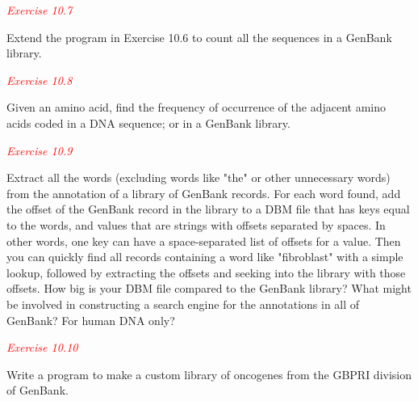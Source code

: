 \textcolor{red}{\textit{Exercise 10.7}}
\begin{adjustwidth}{1cm}{}
Extend the program in Exercise 10.6 to count all the sequences in a GenBank library. 
\end{adjustwidth}

\textcolor{red}{\textit{Exercise 10.8}}
\begin{adjustwidth}{1cm}{}
Given an amino acid, find the frequency of occurrence of the adjacent amino acids coded in a DNA sequence; or in a GenBank library. 
\end{adjustwidth}

\textcolor{red}{\textit{Exercise 10.9}}
\begin{adjustwidth}{1cm}{}
Extract all the words (excluding words like "the" or other unnecessary words) from the annotation of a library of GenBank records. For each word found, add the offset of the GenBank record in the library to a DBM file that has keys equal to the words, and values that are strings with offsets separated by spaces. In other words, one key can have a space-separated list of offsets for a value. Then you can quickly find all records containing a word like "fibroblast" with a simple lookup, followed by extracting the offsets and seeking into the library with those offsets. How big is your DBM file compared to the GenBank library?  What might be involved in constructing a search engine for the annotations in all of GenBank? For human DNA only? 
\end{adjustwidth}

\textcolor{red}{\textit{Exercise 10.10}}
\begin{adjustwidth}{1cm}{}
Write a program to make a custom library of oncogenes from the GBPRI division of GenBank. 
\end{adjustwidth}

